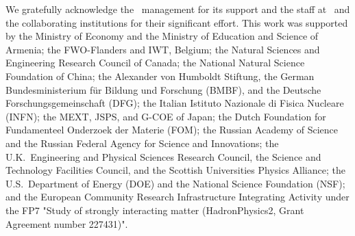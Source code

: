 \acknowledgments
We gratefully acknowledge the \desy\ management for its support and the staff
at \desy\ and the collaborating institutions for their significant effort.
This work was supported by 
the Ministry of Economy and the Ministry of Education and Science of Armenia;
the FWO-Flanders and IWT, Belgium;
the Natural Sciences and Engineering Research Council of Canada;
the National Natural Science Foundation of China;
the Alexander von Humboldt Stiftung,
the German Bundesministerium f\"ur Bildung und Forschung (BMBF), and
the Deutsche Forschungsgemeinschaft (DFG);
the Italian Istituto Nazionale di Fisica Nucleare (INFN);
the MEXT, JSPS, and G-COE of Japan;
the Dutch Foundation for Fundamenteel Onderzoek der Materie (FOM);
the Russian Academy of Science and the Russian Federal Agency for 
Science and Innovations;
the U.K.~Engineering and Physical Sciences Research Council, 
the Science and Technology Facilities Council,
and the Scottish Universities Physics Alliance;
the U.S.~Department of Energy (DOE) and the National Science Foundation (NSF);
and the European Community Research Infrastructure Integrating Activity
under the FP7 "Study of strongly interacting matter (HadronPhysics2, Grant
Agreement number 227431)".

